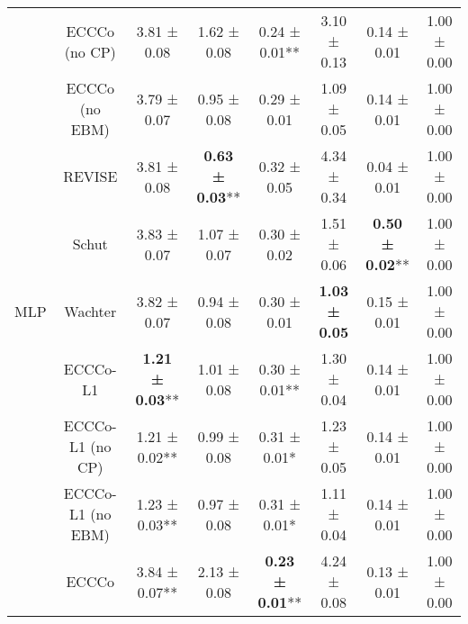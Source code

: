 \begin{table}
{\begin{tabular}[t]{cccccccc}
 & ECCCo (no CP) & 3.81 ± 0.08\hphantom{*}\hphantom{*} & 1.62 ± 0.08\hphantom{*}\hphantom{*} & 0.24 ± 0.01** & 3.10 ± 0.13\hphantom{*}\hphantom{*} & 0.14 ± 0.01\hphantom{*}\hphantom{*} & 1.00 ± 0.00\hphantom{*}\hphantom{*}\\

 & ECCCo (no EBM) & 3.79 ± 0.07\hphantom{*}\hphantom{*} & 0.95 ± 0.08\hphantom{*}\hphantom{*} & 0.29 ± 0.01\hphantom{*}\hphantom{*} & 1.09 ± 0.05\hphantom{*}\hphantom{*} & 0.14 ± 0.01\hphantom{*}\hphantom{*} & 1.00 ± 0.00\hphantom{*}\hphantom{*}\\

 & REVISE & 3.81 ± 0.08\hphantom{*}\hphantom{*} & \textbf{0.63 ± 0.03}** & 0.32 ± 0.05\hphantom{*}\hphantom{*} & 4.34 ± 0.34\hphantom{*}\hphantom{*} & 0.04 ± 0.01\hphantom{*}\hphantom{*} & 1.00 ± 0.00\hphantom{*}\hphantom{*}\\

 & Schut & 3.83 ± 0.07\hphantom{*}\hphantom{*} & 1.07 ± 0.07\hphantom{*}\hphantom{*} & 0.30 ± 0.02\hphantom{*}\hphantom{*} & 1.51 ± 0.06\hphantom{*}\hphantom{*} & \textbf{0.50 ± 0.02}** & 1.00 ± 0.00\hphantom{*}\hphantom{*}\\

\multirow[t]{-10}{*}{\centering\arraybackslash MLP} & Wachter & 3.82 ± 0.07\hphantom{*}\hphantom{*} & 0.94 ± 0.08\hphantom{*}\hphantom{*} & 0.30 ± 0.01\hphantom{*}\hphantom{*} & \textbf{1.03 ± 0.05}\hphantom{*}\hphantom{*} & 0.15 ± 0.01\hphantom{*}\hphantom{*} & 1.00 ± 0.00\hphantom{*}\hphantom{*}\\
\cmidrule{1-8}
 & ECCCo-L1 & \textbf{1.21 ± 0.03}** & 1.01 ± 0.08\hphantom{*}\hphantom{*} & 0.30 ± 0.01** & 1.30 ± 0.04\hphantom{*}\hphantom{*} & 0.14 ± 0.01\hphantom{*}\hphantom{*} & 1.00 ± 0.00\hphantom{*}\hphantom{*}\\

 & ECCCo-L1 (no CP) & 1.21 ± 0.02** & 0.99 ± 0.08\hphantom{*}\hphantom{*} & 0.31 ± 0.01*\hphantom{*} & 1.23 ± 0.05\hphantom{*}\hphantom{*} & 0.14 ± 0.01\hphantom{*}\hphantom{*} & 1.00 ± 0.00\hphantom{*}\hphantom{*}\\

 & ECCCo-L1 (no EBM) & 1.23 ± 0.03** & 0.97 ± 0.08\hphantom{*}\hphantom{*} & 0.31 ± 0.01*\hphantom{*} & 1.11 ± 0.04\hphantom{*}\hphantom{*} & 0.14 ± 0.01\hphantom{*}\hphantom{*} & 1.00 ± 0.00\hphantom{*}\hphantom{*}\\

 & ECCCo & 3.84 ± 0.07** & 2.13 ± 0.08\hphantom{*}\hphantom{*} & \textbf{0.23 ± 0.01}** & 4.24 ± 0.08\hphantom{*}\hphantom{*} & 0.13 ± 0.01\hphantom{*}\hphantom{*} & 1.00 ± 0.00\hphantom{*}\hphantom{*}\\


\end{tabular}}
\end{table}
